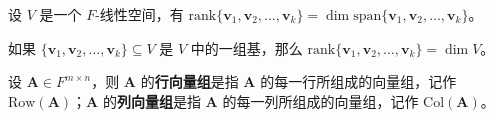 \begin{proposition}
    设 $V$ 是一个 $F$-线性空间，有 $\mathrm{rank}\{\mathbf{v}_1,\mathbf{v}_2,\ldots,\mathbf{v}_k\}= \dim \mathrm{span}\{\mathbf{v}_1,\mathbf{v}_2,\ldots,\mathbf{v}_k\}$。
\end{proposition}

\begin{corollary}
    如果 $\{\mathbf{v}_1,\mathbf{v}_2,\ldots,\mathbf{v}_k\}\subseteq V$ 是 $V$ 中的一组基，那么 $\mathrm{rank}\{\mathbf{v}_1,\mathbf{v}_2,\ldots,\mathbf{v}_k\} = \dim V$。
\end{corollary}

\begin{definition}[行向量组与列向量组]
    设 $\mathbf{A} \in F^{m \times n}$，则 $\mathbf{A}$ 的\textbf{行向量组}是指 $\mathbf{A}$ 的每一行所组成的向量组，记作 $\mathrm{Row}(\mathbf{A})$；$\mathbf{A}$ 的\textbf{列向量组}是指 $\mathbf{A}$ 的每一列所组成的向量组，记作 $\mathrm{Col}(\mathbf{A})$。
\end{definition}

